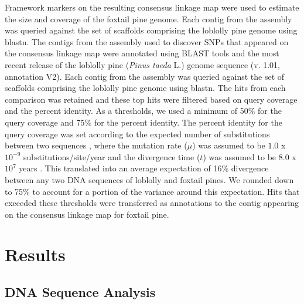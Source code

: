 \documentclass[11pt]{article}
\begin{document}
Framework markers on the resulting consensus linkage map were used to estimate the size \citep{Chakravarti:1991} and
coverage \citep{Lange:1982} of the foxtail pine genome.  Each contig from the assembly was queried against 
the set of scaffolds comprising the loblolly pine genome using blastn.  The contigs 
from the assembly used to discover SNPs that appeared on the consensus linkage map were annotated using BLAST tools \citep{Altschul:1990vt} 
and the most recent release of the loblolly pine (\textit{Pinus taeda} L.) genome sequence (v. 1.01, annotation V2). Each contig from the 
assembly was queried against the set of scaffolds comprising the loblolly pine genome using blastn. The hits from each comparison was 
retained and these top hits were filtered based on query coverage and the percent identity. As a thresholds, we used a minimum of 50\% for the query
coverage and 75\% for the percent identity. The percent identity for the query coverage was set according to the expected number
of substitutions between two sequences \citep[$2 \mu t$, see][]{Nei:1987}, where the mutation rate ($\mu$) was assumed to be 
$1.0$ x $10^{-9}$ substitutions/site/year and the divergence time ($t$) was assumed to be $8.0$ x $10^{7}$ years \citep{Willyard:2007}. 
This translated into an average expectation of 16\% divergence between any two DNA sequences of loblolly and foxtail pines. We rounded down to 
75\% to account for a portion of the variance around this expectation. Hits that exceeded these thresholds were transferred as annotations to the contig 
appearing on the consensus linkage map for foxtail pine. 

\section*{Results}

\subsection*{DNA Sequence Analysis}
\end{document}
